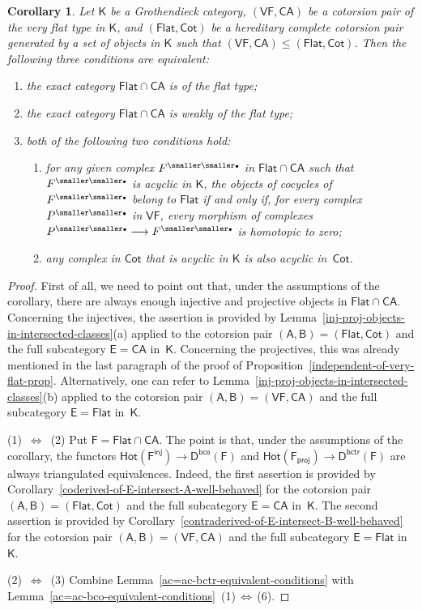 \documentclass[12pt,a4paper]{amsart}
\newcommand{\+}{\nobreakdash-}
\renewcommand{\:}{\colon}
\newcommand{\rarrow}{\longrightarrow}
\newcommand{\bu}{{\text{\smaller\smaller$\scriptstyle\bullet$}}}
\newcommand{\sA}{\mathsf A}
\newcommand{\sB}{\mathsf B}
\newcommand{\sD}{\mathsf D}
\newcommand{\sE}{\mathsf E}
\newcommand{\sF}{\mathsf F}
\newcommand{\sK}{\mathsf K}
\newcommand{\VF}{\mathsf{VF}}
\newcommand{\CA}{\mathsf{CA}}
\newcommand{\Flat}{\mathsf{Flat}}
\newcommand{\Cot}{\mathsf{Cot}}
\newcommand{\Hot}{\mathsf{Hot}}
\newcommand{\proj}{\mathsf{proj}}
\newcommand{\inj}{\mathsf{inj}}
\newcommand{\bco}{\mathsf{bco}}
\newcommand{\bctr}{\mathsf{bctr}}
\theoremstyle{plain}
\newtheorem{cor}[thm]{Corollary}
\theoremstyle{definition}
\begin{document}
\begin{cor} \label{flat-type-definition-cor}
 Let\/ $\sK$ be a Grothendieck category, $(\VF,\CA)$ be a cotorsion pair
of the very flat type in\/ $\sK$, and $(\Flat,\Cot)$ be a hereditary
complete cotorsion pair generated by a set of objects in\/ $\sK$
such that $(\VF,\CA)\le(\Flat,\Cot)$.
 Then the following three conditions are equivalent:
\begin{enumerate}
\item the exact category\/ $\Flat\cap\CA$ is of the flat type;
\item the exact category\/ $\Flat\cap\CA$ is weakly of the flat type;
\item both of the following two conditions hold:
\begin{enumerate}
\renewcommand{\theenumii}{\Roman{enumii}}
\item for any given complex $F^\bu$ in\/ $\Flat\cap\CA$ such that
$F^\bu$ is acyclic in\/ $\sK$, the objects of cocycles of $F^\bu$ belong
to\/ $\Flat$ if and only if, for every complex $P^\bu$ in\/ $\VF$,
every morphism of complexes $P^\bu\rarrow F^\bu$ is homotopic to zero;
\item any complex in\/ $\Cot$ that is acyclic in\/ $\sK$ is also
acyclic in\/~$\Cot$.
\end{enumerate}
\end{enumerate}
\end{cor}

\begin{proof}
 First of all, we need to point out that, under the assumptions of
the corollary, there are always enough injective and projective objects
in $\Flat\cap\CA$.
 Concerning the injectives, the assertion is provided by
Lemma~\ref{inj-proj-objects-in-intersected-classes}(a) applied
to the cotorsion pair $(\sA,\sB)=(\Flat,\Cot)$ and the full subcategory
$\sE=\CA$ in~$\sK$.
 Concerning the projectives, this was already mentioned in the last
paragraph of the proof of
Proposition~\ref{independent-of-very-flat-prop}.
 Alternatively, one can refer to
Lemma~\ref{inj-proj-objects-in-intersected-classes}(b) applied
to the cotorsion pair $(\sA,\sB)=(\VF,\CA)$ and the full subcategory
$\sE=\Flat$ in~$\sK$.

 (1)~$\Longleftrightarrow$~(2)
 Put $\sF=\Flat\cap\CA$.
 The point is that, under the assumptions of the corollary,
the functors $\Hot(\sF^\inj)\rarrow\sD^\bco(\sF)$ and
$\Hot(\sF_\proj)\rarrow\sD^\bctr(\sF)$ are always triangulated
equivalences.
 Indeed, the first assertion is provided by
Corollary~\ref{coderived-of-E-intersect-A-well-behaved}
for the cotorsion pair $(\sA,\sB)=(\Flat,\Cot)$ and the full
subcategory $\sE=\CA$ in~$\sK$.
 The second assertion is provided by
Corollary~\ref{contraderived-of-E-intersect-B-well-behaved}
for the cotorsion pair $(\sA,\sB)=(\VF,\CA)$ and the full
subcategory $\sE=\Flat$ in~$\sK$.

 (2)~$\Longleftrightarrow$~(3)
 Combine Lemma~\ref{ac=ac-bctr-equivalent-conditions} with
Lemma~\ref{ac=ac-bco-equivalent-conditions}\,%
(1)\,$\Leftrightarrow$\,(6).
\end{proof}
\end{document}
